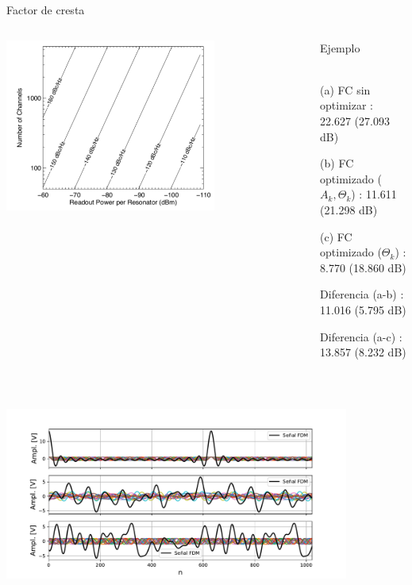 \documentclass[ignorenonframetext,12pt]{beamer}
\begin{document}
\begin{frame}{Factor de cresta }
				\begin{columns}
								\begin{column}{0.5\textwidth}
												\includegraphics[width=0.7\textwidth]{power_vs_Nchannels2}
								\end{column}
								\begin{column}{0.5\textwidth}{{\color{blue}Ejemplo}}
												\footnotesize{\\(a) FC sin optimizar  : 22.627 (27.093 dB)

												(b)	FC optimizado ($A_k,\Theta_k$)  : 11.611 (21.298 dB)

												(c)	FC optimizado ($\Theta_k$)     : 8.770 (18.860 dB)

												Diferencia (a-b)                : 11.016 (5.795 dB)

												Diferencia (a-c)                : 13.857 (8.232 dB)}\\
								\end{column}
				\end{columns}
												\includegraphics[width=0.85\textwidth]{in_spectrum_time2}
\end{frame}
\end{document}
